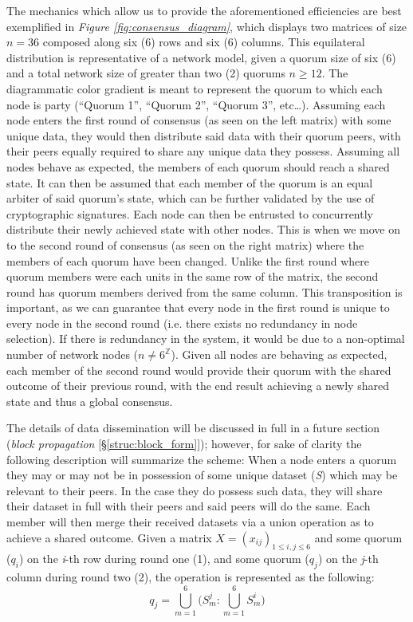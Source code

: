 The mechanics which allow us to provide the aforementioned efficiencies are best exemplified in \textit{Figure \ref{fig:consensus_diagram}}, which displays two matrices of size \(n=36\) composed along six (6) rows and six (6) columns. This equilateral distribution is representative of a network model, given a quorum size of six (6) and a total network size of greater than two (2) quorums \(n \ge 12\). The diagrammatic color gradient is meant to represent the quorum to which each node is party (“Quorum 1”, “Quorum 2”, “Quorum 3”, etc…). Assuming each node enters the first round of consensus (as seen on the left matrix) with some unique data, they would then distribute said data with their quorum peers, with their peers equally required to share any unique data they possess. Assuming all nodes behave as expected, the members of each quorum should reach a shared state. It can then be assumed that each member of the quorum is an equal arbiter of said quorum's state, which can be further validated by the use of cryptographic signatures. Each node can then be entrusted to concurrently distribute their newly achieved state with other nodes. This is when we move on to the second round of consensus (as seen on the right matrix) where the members of each quorum have been changed. Unlike the first round where quorum members were each units in the same row of the matrix, the second round has quorum members derived from the same column. This transposition is important, as we can guarantee that every node in the first round is unique to every node in the second round (i.e. there exists no redundancy in node selection). If there is redundancy in the system, it would be due to a non-optimal number of network nodes (\(n \neq 6^{\mathbb{Z}}\)). Given all nodes are behaving as expected, each member of the second round would provide their quorum with the shared outcome of their previous round, with the end result achieving a newly shared state and thus a global consensus.

The details of data dissemination will be discussed in full in a future section (\textit{block propagation} [\S\ref{struc:block_form}]); however, for sake of clarity the following description will summarize the scheme: When a node enters a quorum they may or may not be in possession of some unique dataset (\textit{S}) which may be relevant to their peers. In the case they do possess such data, they will share their dataset in full with their peers and said peers will do the same. Each member will then merge their received datasets via a union operation as to achieve a shared outcome. Given a matrix \(X=(x_{ij})_{1\le i,j\le 6}\) and some quorum (\(q_i\)) on the \textit{i}-th row during round one (1), and some quorum (\(q_j\)) on the \textit{j}-th column during round two (2), the operation is represented as the following:
\[
q_j = \bigcup^6_{m=1}
\big (
S^j_m:\bigcup^6_{m=1}S^i_m 
\big )
\]

